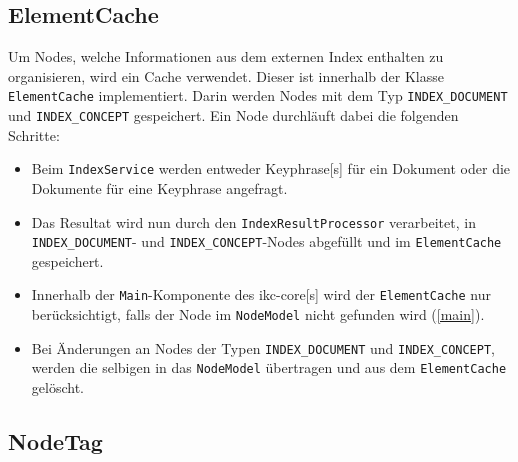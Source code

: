
\subsection{ElementCache}


Um Nodes, welche Informationen aus dem externen Index enthalten zu organisieren, wird ein Cache verwendet. Dieser ist innerhalb der Klasse \texttt{ElementCache} implementiert. Darin werden Nodes mit dem Typ \verb|INDEX_DOCUMENT| und \verb|INDEX_CONCEPT| gespeichert. Ein Node durchläuft dabei die folgenden Schritte:
\begin{itemize}
    \item Beim \texttt{IndexService} werden entweder \gls{Keyphrase}[s] für ein Dokument oder die Dokumente für eine \gls{Keyphrase} angefragt. 
    \item Das Resultat wird nun durch den \texttt{Index\-Result\-Pro\-ces\-sor} verarbeitet, in \verb|INDEX_DOCUMENT|- und \verb|INDEX_CONCEPT|-Nodes abgefüllt und im \texttt{ElementCache} gespeichert.
    \item Innerhalb der \texttt{Main}-Komponente des \gls{ikc-core}[s] wird der \texttt{Ele\-ment\-Cache} nur berücksichtigt, falls der Node im \texttt{NodeModel} nicht gefunden wird (\autoref{main}).
    
    
    \item Bei Änderungen an Nodes der Typen \verb|INDEX_DOCUMENT| und \verb|INDE|\newline\verb|X_CONCEPT|, werden die selbigen in das \texttt{NodeModel} übertragen und aus dem \texttt{ElementCache} gelöscht.

\end{itemize}


\subsection{NodeTag}

